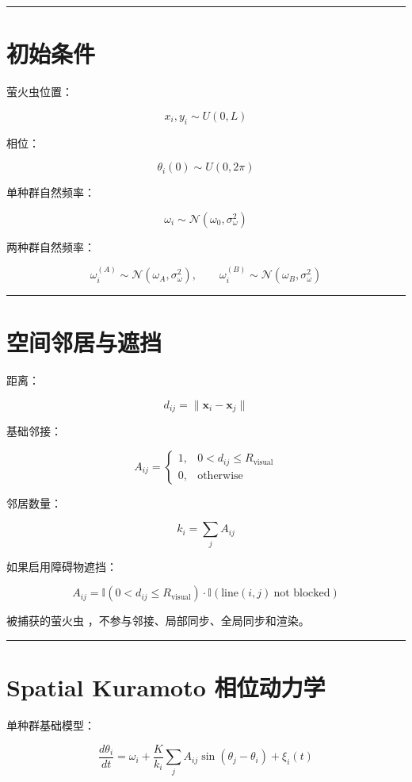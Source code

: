 \documentclass[UTF8]{ctexart}
\begin{document}
\bigskip
\hrule
\bigskip

\section{初始条件}

萤火虫位置：

\[
x_i,y_i\sim U(0,L)
\]

相位：

\[
\theta_i(0)\sim U(0,2\pi)
\]

单种群自然频率：

\[
\omega_i\sim \mathcal{N}(\omega_0,\sigma_\omega^2)
\]

两种群自然频率：

\[
\omega_i^{(A)}\sim \mathcal{N}(\omega_A,\sigma_\omega^2),
\qquad
\omega_i^{(B)}\sim \mathcal{N}(\omega_B,\sigma_\omega^2)
\]

\bigskip
\hrule
\bigskip

\section{空间邻居与遮挡}

距离：

\[
d_{ij}=\|\mathbf{x}_i-\mathbf{x}_j\|
\]

基础邻接：

\[
A_{ij}=
\begin{cases}
1,&0<d_{ij}\le R_{\text{visual}}\\
0,&\text{otherwise}
\end{cases}
\]

邻居数量：

\[
k_i=\sum_j A_{ij}
\]

如果启用障碍物遮挡：

\[
A_{ij}
=
\mathbb{I}(0<d_{ij}\le R_{\text{visual}})
\cdot
\mathbb{I}(\text{line}(i,j)\ \text{not blocked})
\]

被捕获的萤火虫 \texttt{}，不参与邻接、局部同步、全局同步和渲染。

\bigskip
\hrule
\bigskip

\section{Spatial Kuramoto 相位动力学}

单种群基础模型：

\[
\frac{d\theta_i}{dt}
=
\omega_i
+
\frac{K}{k_i}
\sum_j A_{ij}\sin(\theta_j-\theta_i)
+
\xi_i(t)
\]
\end{document}
